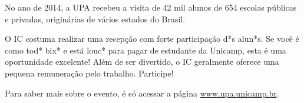 No ano de 2014, a UPA recebeu a visita de 42 mil alunos de 654 escolas públicas
e privadas, originárias de vários estados do Brasil.

O IC costuma realizar uma recepção com forte participação d*s alun*s. Se você é
como tod* bix* e está louc* para pagar de estudante da Unicamp, esta é uma
oportunidade excelente! Além de ser divertido, o IC geralmente oferece uma
pequena remuneração pelo trabalho. Participe!

Para saber mais sobre o evento, é só acessar a página \url{www.upa.unicamp.br}.
